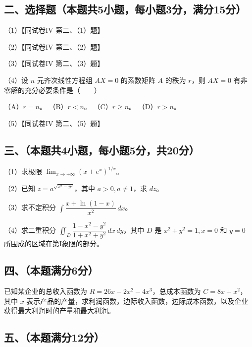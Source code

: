 \documentclass[UTF8,12pt]{ctexart}
\begin{document}
\subsection*{二、选择题（本题共5小题，每小题3分，满分15分）}

（1）【同试卷IV 第二、（1）题】


（2）【同试卷IV 第二、（2）题】


（3）【同试卷IV 第二、（3）题】


（4）设 \(\displaystyle n\) 元齐次线性方程组 \(\displaystyle AX=0\) 的系数矩阵 \(\displaystyle A\) 的秩为 \(\displaystyle r\)，则 \(\displaystyle AX=0\) 有非零解的充分必要条件是（　　）


（A）\(\displaystyle r=n\)。 （B）\(\displaystyle r<n\)。 （C）\(\displaystyle r\ge n\)。 （D）\(\displaystyle r>n\)。


（5）【同试卷IV 第二、（5）题】


\subsection*{三、（本题共4小题，每小题5分，共20分）}

（1）求极限 \(\displaystyle \lim_{x\to+\infty}(x+e^x)^{1/x}\)。


（2）已知 \(\displaystyle z=a^{\sqrt{x^2-y^2}}\)，其中 \(\displaystyle a>0,\allowbreak a\ne1\)，求 \(\displaystyle dz\)。


（3）求不定积分 \(\displaystyle \int\dfrac{\displaystyle x+\ln(1-x)}{\displaystyle x^2}\,dx\)。


（4）求二重积分 \(\displaystyle \iint_D\dfrac{\displaystyle 1-x^2-y^2}{\displaystyle 1+x^2+y^2}\,dx\,dy\)，其中 \(\displaystyle D\) 是 \(\displaystyle x^2+y^2=1,\allowbreak x=0\) 和 \(\displaystyle y=0\) 所围成的区域在第I象限的部分。


\subsection*{四、（本题满分6分）}

已知某企业的总收入函数为 \(\displaystyle R=26x-2x^2-4x^3\)，总成本函数为 \(\displaystyle C=8x+x^2\)，其中 \(\displaystyle x\) 表示产品的产量，求利润函数，边际收入函数，边际成本函数，以及企业获得最大利润时的产量和最大利润。


\subsection*{五、（本题满分12分）}
\end{document}
